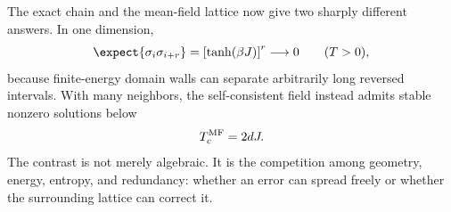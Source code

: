 The exact chain and the mean-field lattice now give two sharply different answers. In one dimension,
\begin{equation}
\expect{\sigma_i\sigma_{i+r}}
=\left[\tanh(\beta J)\right]^r
\longrightarrow0
\qquad (T>0),
\end{equation}
because finite-energy domain walls can separate arbitrarily long reversed intervals. With many neighbors, the self-consistent field instead admits stable nonzero solutions below
\begin{equation}
T_c^{\rm MF}=2dJ.
\end{equation}
The contrast is not merely algebraic. It is the competition among geometry, energy, entropy, and redundancy: whether an error can spread freely or whether the surrounding lattice can correct it.
